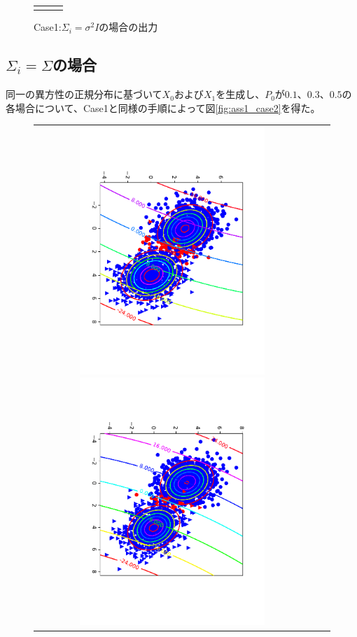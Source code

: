 \documentclass[uplatex,a4paper]{jsarticle}
\begin{document}
\begin{figure}[H]
\begin{center}
\begin{tabular}{ccc}
\begin{minipage}{0.33\linewidth}
\end{minipage}
\end{tabular}
\end{center}
\caption{Case1:$\Sigma_i=\sigma^2I$の場合の出力}
\label{fig:ass1_case1}
\end{figure}
\subsection{$\Sigma_i=\Sigma$の場合}
同一の異方性の正規分布に基づいて$X_0$および$X_1$を生成し、$P_0$が$0.1$、$0.3$、$0.5$の各場合について、Case1と同様の手順によって図\ref{fig:ass1_case2}を得た。
\begin{figure}[H]
\begin{center}
\begin{tabular}{ccc}
\begin{minipage}{0.33\hsize}
\includegraphics[width=7cm]{Model2_10.pdf}
\end{minipage}
\begin{minipage}{0.33\hsize}
\includegraphics[width=7cm]{Model2_30.pdf}

\end{minipage}
\end{tabular}
\end{center}
\end{figure}
\end{document}
